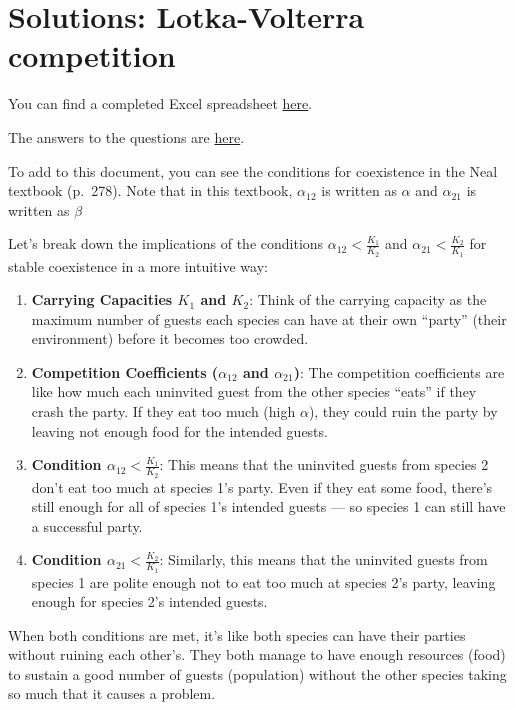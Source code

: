 \documentclass[
  a4paper]{book}
\begin{document}
\section{Solutions: Lotka-Volterra competition}\label{solutions-lotka-volterra-competition}

You can find a completed Excel spreadsheet \href{https://www.dropbox.com/s/q1qoqxhnm82uugw/9.\%20LV\%20Competition.xlsx?dl=1}{here}.

The answers to the questions are \href{https://www.dropbox.com/s/oz2c10bmyf8t7s6/9.\%20Answers\%20to\%20questions.pdf?dl=1}{here}.

To add to this document, you can see the conditions for coexistence in the Neal textbook (p.~278). Note that in this textbook, \(\alpha_{12}\) is written as \(\alpha\) and \(\alpha_{21}\) is written as \(\beta\)

Let's break down the implications of the conditions \(\alpha_{12} < \frac{K_1}{K_2}\) and \(\alpha_{21} < \frac{K_2}{K_1}\) for stable coexistence in a more intuitive way:

\begin{enumerate}
\def\labelenumi{\arabic{enumi}.}
\item
  \textbf{Carrying Capacities \(K_1\) and \(K_2\)}: Think of the carrying capacity as the maximum number of guests each species can have at their own ``party'' (their environment) before it becomes too crowded.
\item
  \textbf{Competition Coefficients (\(\alpha_{12}\) and \(\alpha_{21}\))}: The competition coefficients are like how much each uninvited guest from the other species ``eats'' if they crash the party. If they eat too much (high \(\alpha\)), they could ruin the party by leaving not enough food for the intended guests.
\item
  \textbf{Condition \(\alpha_{12} < \frac{K_1}{K_2}\)}: This means that the uninvited guests from species 2 don't eat too much at species 1's party. Even if they eat some food, there's still enough for all of species 1's intended guests --- so species 1 can still have a successful party.
\item
  \textbf{Condition \(\alpha_{21} < \frac{K_2}{K_1}\)}: Similarly, this means that the uninvited guests from species 1 are polite enough not to eat too much at species 2's party, leaving enough for species 2's intended guests.
\end{enumerate}

When both conditions are met, it's like both species can have their parties without ruining each other's. They both manage to have enough resources (food) to sustain a good number of guests (population) without the other species taking so much that it causes a problem.
\end{document}
